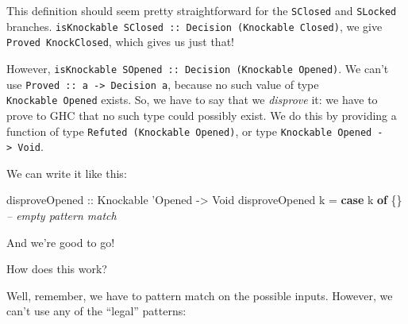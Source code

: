 \documentclass[]{article}
\newenvironment{Shaded}{}{}
\newcommand{\CommentTok}[1]{\textcolor[rgb]{0.38,0.63,0.69}{\textit{#1}}}
\newcommand{\DataTypeTok}[1]{\textcolor[rgb]{0.56,0.13,0.00}{#1}}
\newcommand{\FunctionTok}[1]{\textcolor[rgb]{0.02,0.16,0.49}{#1}}
\newcommand{\KeywordTok}[1]{\textcolor[rgb]{0.00,0.44,0.13}{\textbf{#1}}}
\newcommand{\NormalTok}[1]{#1}
\newcommand{\OtherTok}[1]{\textcolor[rgb]{0.00,0.44,0.13}{#1}}
\begin{document}
\begin{Shaded}
\end{Shaded}

This definition should seem pretty straightforward for the \texttt{SClosed} and
\texttt{SLocked} branches.
\texttt{isKnockable\ SClosed\ ::\ Decision\ (Knockable\ \textquotesingle{}Closed)},
we give \texttt{Proved\ KnockClosed}, which gives us just that!

However,
\texttt{isKnockable\ SOpened\ ::\ Decision\ (Knockable\ \textquotesingle{}Opened)}.
We can't use \texttt{Proved\ ::\ a\ -\textgreater{}\ Decision\ a}, because no
such value of type \texttt{Knockable\ \textquotesingle{}Opened} exists. So, we
have to say that we \emph{disprove} it: we have to prove to GHC that no such
type could possibly exist. We do this by providing a function of type
\texttt{Refuted\ (Knockable\ \textquotesingle{}Opened)}, or type
\texttt{Knockable\ \textquotesingle{}Opened\ -\textgreater{}\ Void}.

We can write it like this:

\begin{Shaded}
\begin{Highlighting}[]
\OtherTok{disproveOpened ::} \DataTypeTok{Knockable}\NormalTok{ '}\DataTypeTok{Opened} \OtherTok{->} \DataTypeTok{Void}
\NormalTok{disproveOpened k }\FunctionTok{=} \KeywordTok{case}\NormalTok{ k }\KeywordTok{of}\NormalTok{ \{\}             }\CommentTok{-- empty pattern match}
\end{Highlighting}
\end{Shaded}

And we're good to go!

How does this work?

Well, remember, we have to pattern match on the possible inputs. However, we
can't use any of the ``legal'' patterns:
\end{document}
